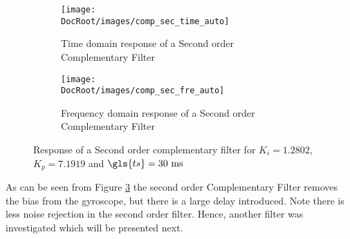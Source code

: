 \begin{figure}[h]
	\centering
	\begin{subfigure}{0.32\textwidth}
		\texttt{[image: \\DocRoot/images/comp\_sec\_time\_auto]}
		\caption{Time domain response of a Second order Complementary Filter}
		\label{fg: Time domain comparison responce of the sec order comp filter auto}
	\end{subfigure}%
	\hspace{3cm}
	\begin{subfigure}{0.32\textwidth}
		\texttt{[image: \\DocRoot/images/comp\_sec\_fre\_auto]}
		\caption{Frequency domain response of a Second order Complementary Filter}
		\label{fg: Frequency domain responce of the sec order comp filter auto}
	\end{subfigure}
	
	\caption{Response of a Second order complementary filter for $K_i = 1.2802$, $K_p = 7.1919$ and ${\gls{ts}} = 30~\mathrm{ms}$ }
	\label{fig sec order comp time and freq responce auto}
\end{figure}

As can be seen from Figure \ref{fig sec order comp time and freq responce auto} the second order Complementary Filter removes the bias from the gyroscope, but there is a large delay introduced. Note there is less noise rejection in the second order filter. Hence, another filter was investigated which will be presented next.